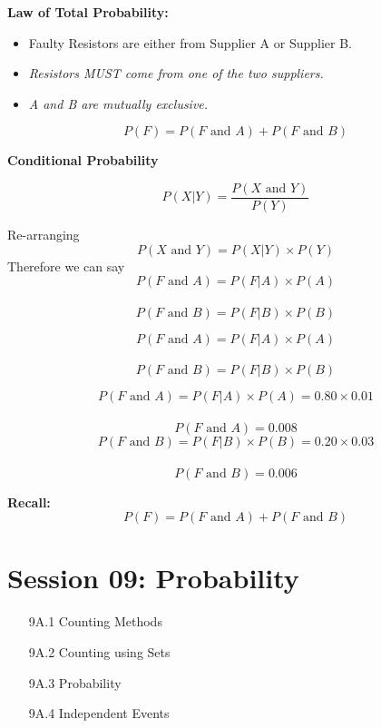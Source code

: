 \documentclass[12pt]{report}
\begin{document}
{{%


\Large
\textbf{Law of Total Probability:}
\begin{itemize}
	\item Faulty Resistors are either from Supplier A or Supplier B.
	\vspace{0.3cm} 
	\item \textit{Resistors MUST come from one of the two suppliers.}
	\item \textit{A and B are mutually exclusive.}
\end{itemize}
\vspace{0.3cm} 
\[ P(F) = P(F \mbox{ and } A) + P(F \mbox{ and } B) \]




\Large
\textbf{Conditional Probability}

\[ P(X|Y)  = \frac{P(X \mbox{ and } Y)}{P(Y)} \]

Re-arranging
\[ P(X \mbox{ and } Y) =  P(X|Y)\times P(Y) \]
Therefore we can say
\[ P(F \mbox{ and } A) =  P(F|A)\times P(A) \]\\
\[ P(F \mbox{ and } B) =  P(F|B)\times P(B) \]



\Large

\[ P(F \mbox{ and } A) =  P(F|A)\times P(A) \]\\
\vspace{1.7cm}
\[ P(F \mbox{ and } B) =  P(F|B)\times P(B) \]



\Large
\[ P(F \mbox{ and } A) =  P(F|A)\times P(A) = 0.80 \times 0.01\]\\
\[ P(F \mbox{ and } A) = 0.008\]
\bigskip
\[ P(F \mbox{ and } B) =  P(F|B)\times P(B) = 0.20 \times 0.03\]\\
\[ P(F \mbox{ and } B) = 0.006\]

\textbf{Recall:}
\[ P(F) = P(F \mbox{ and } A) + P(F \mbox{ and } B) \]



\section*{Session 09: Probability}
\begin{itemize}
	\item[9A.1] Counting Methods
	\item[9A.2] Counting using Sets
	\item[9A.3] Probability
	\item[9A.4] Independent Events
\end{itemize}


}}
\end{document}
